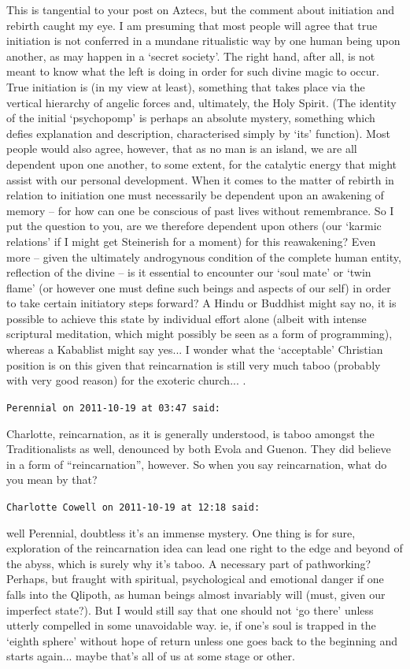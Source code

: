 \begin{footnotesize}
\begin{sffamily}
This is tangential to your post on Aztecs, but the comment about initiation and rebirth caught my eye. I am presuming that most people will agree that true initiation is not conferred in a mundane ritualistic way by one human being upon another, as may happen in a `secret society'. The right hand, after all, is not meant to know what the left is doing in order for such divine magic to occur. True initiation is (in my view at least), something that takes place via the vertical hierarchy of angelic forces and, ultimately, the Holy Spirit. (The identity of the initial `psychopomp' is perhaps an absolute mystery, something which defies explanation and description, characterised simply by `its' function). Most people would also agree, however, that as no man is an island, we are all dependent upon one another, to some extent, for the catalytic energy that might assist with our personal development. When it comes to the matter of rebirth in relation to initiation one must necessarily be dependent upon an awakening of memory -- for how can one be conscious of past lives without remembrance. So I put the question to you, are we therefore dependent upon others (our `karmic relations' if I might get Steinerish for a moment) for this reawakening? Even more -- given the ultimately androgynous condition of the complete human entity, reflection of the divine -- is it essential to encounter our `soul mate' or `twin flame' (or however one must define such beings and aspects of our self) in order to take certain initiatory steps forward? A Hindu or Buddhist might say no, it is possible to achieve this state by individual effort alone (albeit with intense scriptural meditation, which might possibly be seen as a form of programming), whereas a Kabablist might say yes... I wonder what the `acceptable' Christian position is on this given that reincarnation is still very much taboo (probably with very good reason) for the exoteric church... .

\hfill

\texttt{Perennial on 2011-10-19 at 03:47 said:}

Charlotte, reincarnation, as it is generally understood, is taboo amongst the Traditionalists as well, denounced by both Evola and Guenon. They did believe in a form of ``reincarnation'', however. So when you say reincarnation, what do you mean by that?

\hfill

\texttt{Charlotte Cowell on 2011-10-19 at 12:18 said:}

well Perennial, doubtless it's an immense mystery. One thing is for sure, exploration of the reincarnation idea can lead one right to the edge and beyond of the abyss, which is surely why it's taboo. A necessary part of pathworking? Perhaps, but fraught with spiritual, psychological and emotional danger if one falls into the Qlipoth, as human beings almost invariably will (must, given our imperfect state?). But I would still say that one should not `go there' unless utterly compelled in some unavoidable way. ie, if one's soul is trapped in the `eighth sphere' without hope of return unless one goes back to the beginning and starts again... maybe that's all of us at some stage or other.


\end{sffamily}
\end{footnotesize}
